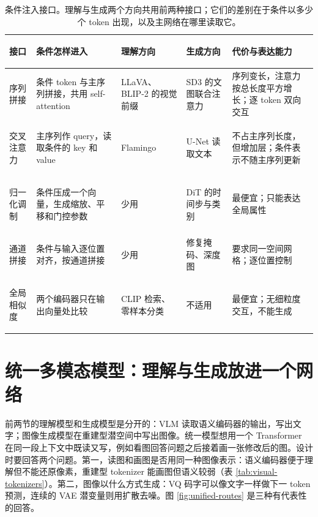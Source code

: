 \begin{table}[ht]
\centering\small
\begin{tabularx}{\textwidth}{>{\bfseries\raggedright\arraybackslash}p{19mm} >{\raggedright\arraybackslash}X >{\raggedright\arraybackslash}p{22mm} >{\raggedright\arraybackslash}p{22mm} >{\raggedright\arraybackslash}X}
\toprule
接口 & 条件怎样进入 & 理解方向 & 生成方向 & 代价与表达能力\\
\midrule
序列拼接 & 条件 token 与主序列拼接，共用 self-attention & LLaVA、BLIP-2 的视觉前缀 & SD3 的文图联合注意力 & 序列变长，注意力按总长度平方增长；逐 token 双向交互\\
交叉注意力 & 主序列作 query，读取条件的 key 和 value & Flamingo & U-Net 读取文本 & 不占主序列长度，但增加层；条件表示不随主序列更新\\
归一化调制 & 条件压成一个向量，生成缩放、平移和门控参数 & 少用 & DiT 的时间步与类别 & 最便宜；只能表达全局属性\\
通道拼接 & 条件与输入逐位置对齐，按通道拼接 & 少用 & 修复掩码、深度图 & 要求同一空间网格；逐位置控制\\
全局相似度 & 两个编码器只在输出向量处比较 & CLIP 检索、零样本分类 & 不适用 & 最便宜；无细粒度交互，不能生成\\
\bottomrule
\end{tabularx}
\caption{条件注入接口。理解与生成两个方向共用前两种接口；它们的差别在于条件以多少个 token 出现，以及主网络在哪里读取它。}
\label{tab:condition-interfaces}
\end{table}

\section{统一多模态模型：理解与生成放进一个网络}
\label{sec:unified-multimodal}

前两节的理解模型和生成模型是分开的：VLM 读取语义编码器的输出，写出文字；图像生成模型在重建型潜空间中写出图像。统一模型想用一个 Transformer 在同一段上下文中既读又写，例如看图回答问题之后接着画一张修改后的图。设计时要回答两个问题。第一，读图和画图是否用同一种图像表示：语义编码器便于理解但不能还原像素，重建型 tokenizer 能画图但语义较弱（表 \ref{tab:visual-tokenizers}）。第二，图像以什么方式生成：VQ 码字可以像文字一样做下一 token 预测，连续的 VAE 潜变量则用扩散去噪。图 \ref{fig:unified-routes} 是三种有代表性的回答。

